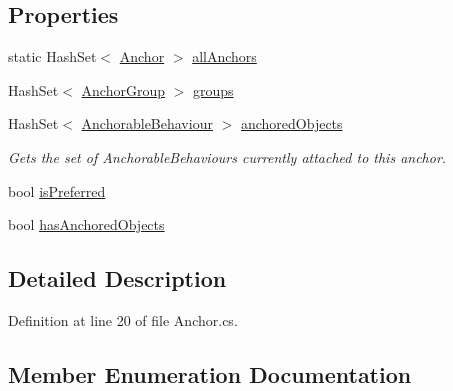\subsection*{Properties}
\begin{DoxyCompactItemize}
\item 
static Hash\+Set$<$ \mbox{\hyperlink{class_leap_1_1_unity_1_1_interaction_1_1_anchor}{Anchor}} $>$ \mbox{\hyperlink{class_leap_1_1_unity_1_1_interaction_1_1_anchor_ac55ba01abd9142448ba2ec9dc1f66baa}{all\+Anchors}}
\item 
Hash\+Set$<$ \mbox{\hyperlink{class_leap_1_1_unity_1_1_interaction_1_1_anchor_group}{Anchor\+Group}} $>$ \mbox{\hyperlink{class_leap_1_1_unity_1_1_interaction_1_1_anchor_a4f233c6361e5c63d04fd58abb1a9e1f6}{groups}}
\item 
Hash\+Set$<$ \mbox{\hyperlink{class_leap_1_1_unity_1_1_interaction_1_1_anchorable_behaviour}{Anchorable\+Behaviour}} $>$ \mbox{\hyperlink{class_leap_1_1_unity_1_1_interaction_1_1_anchor_a33e0bc00ec1ff195fac8f709abe72cbc}{anchored\+Objects}}
\begin{DoxyCompactList}\small\item\em Gets the set of Anchorable\+Behaviours currently attached to this anchor. \end{DoxyCompactList}\item 
bool \mbox{\hyperlink{class_leap_1_1_unity_1_1_interaction_1_1_anchor_a86227a39919928835b07fa93eda32551}{is\+Preferred}}
\item 
bool \mbox{\hyperlink{class_leap_1_1_unity_1_1_interaction_1_1_anchor_a0eead1f76beaa595b1cc2655d38e56bb}{has\+Anchored\+Objects}}
\end{DoxyCompactItemize}


\subsection{Detailed Description}


Definition at line 20 of file Anchor.\+cs.



\subsection{Member Enumeration Documentation}
\mbox{\label{class_leap_1_1_unity_1_1_interaction_1_1_anchor_ac467f8e75926408d0fc27e8e0e132204}} 
